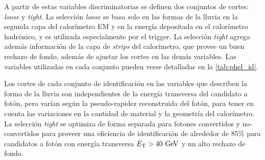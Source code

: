 A partir de estas variables discriminatorias se definen dos conjuntos de cortes: \emph{loose} y
\emph{tight}.
La selección \emph{loose} se basa solo en las formas de la lluvia
en la segunda capa del calorímetro EM y en la energía depositada en el
calorímetro hadrónico, y es utilizada especialmente por el trigger. La selección
\emph{tight} agrega además información de la capa de \emph{strips} del calorímetro, que
provee un buen rechazo de fondo, %
además de ajustar los cortes en las
demás variables. Las variables utilizadas en cada conjunto pueden verse detalladas
en la \cref{tab:phel_id}.

Los cortes de cada conjunto de identificación en las variables que
describen la forma de la lluvia son independientes de la energía transversa del
candidato a fotón, pero varían según la pseudo-rapidez reconstruida del fotón,
para tener en cuenta las variaciones en la cantidad de material y la geometría
del calorímetro.
La selección \emph{tight} se optimiza de forma separada para
fotones convertidos y no-convertidos para proveer una eficiencia de
identificación de alrededor de 85\% para candidatos a fotón con energía
transversa $\et>40 \gev$ y un alto rechazo de fondo\cite{PhotonPerf}.



